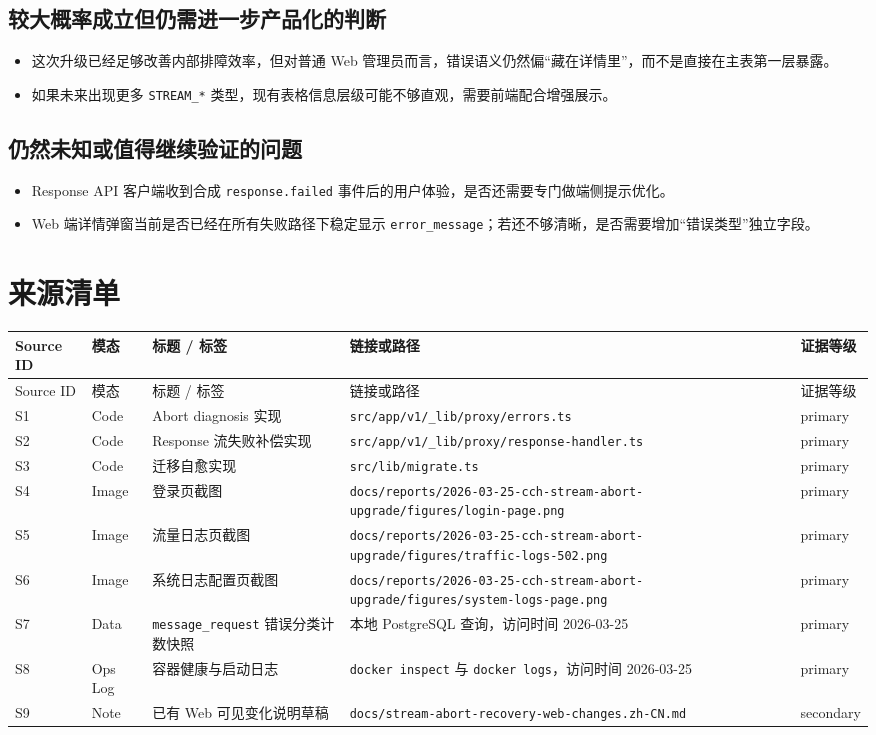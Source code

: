 \documentclass[a4paper]{article}
\begin{document}
\subsection*{较大概率成立但仍需进一步产品化的判断}
\begin{itemize}
\item 这次升级已经足够改善内部排障效率，但对普通 Web 管理员而言，错误语义仍然偏“藏在详情里”，而不是直接在主表第一层暴露。
\item 如果未来出现更多 \texttt{STREAM\_*} 类型，现有表格信息层级可能不够直观，需要前端配合增强展示。
\end{itemize}

\subsection*{仍然未知或值得继续验证的问题}
\begin{itemize}
\item Response API 客户端收到合成 \texttt{response.failed} 事件后的用户体验，是否还需要专门做端侧提示优化。
\item Web 端详情弹窗当前是否已经在所有失败路径下稳定显示 \texttt{error\_message}；若还不够清晰，是否需要增加“错误类型”独立字段。
\end{itemize}

\appendix
\section{来源清单}

\small
\begin{longtable}{p{1.2cm}p{1.7cm}p{3.2cm}p{5.1cm}p{1.6cm}}
\toprule
Source ID & 模态 & 标题 / 标签 & 链接或路径 & 证据等级 \\
\midrule
\endfirsthead
\toprule
Source ID & 模态 & 标题 / 标签 & 链接或路径 & 证据等级 \\
\midrule
\endhead
S1 & Code & Abort diagnosis 实现 & \texttt{src/app/v1/\_lib/proxy/errors.ts} & primary \\
S2 & Code & Response 流失败补偿实现 & \texttt{src/app/v1/\_lib/proxy/response-handler.ts} & primary \\
S3 & Code & 迁移自愈实现 & \texttt{src/lib/migrate.ts} & primary \\
S4 & Image & 登录页截图 & \texttt{docs/reports/2026-03-25-cch-stream-abort-upgrade/figures/login-page.png} & primary \\
S5 & Image & 流量日志页截图 & \texttt{docs/reports/2026-03-25-cch-stream-abort-upgrade/figures/traffic-logs-502.png} & primary \\
S6 & Image & 系统日志配置页截图 & \texttt{docs/reports/2026-03-25-cch-stream-abort-upgrade/figures/system-logs-page.png} & primary \\
S7 & Data & \texttt{message\_request} 错误分类计数快照 & 本地 PostgreSQL 查询，访问时间 2026-03-25 & primary \\
S8 & Ops Log & 容器健康与启动日志 & \texttt{docker inspect} 与 \texttt{docker logs}，访问时间 2026-03-25 & primary \\
S9 & Note & 已有 Web 可见变化说明草稿 & \texttt{docs/stream-abort-recovery-web-changes.zh-CN.md} & secondary \\
\bottomrule
\end{longtable}
\end{document}
